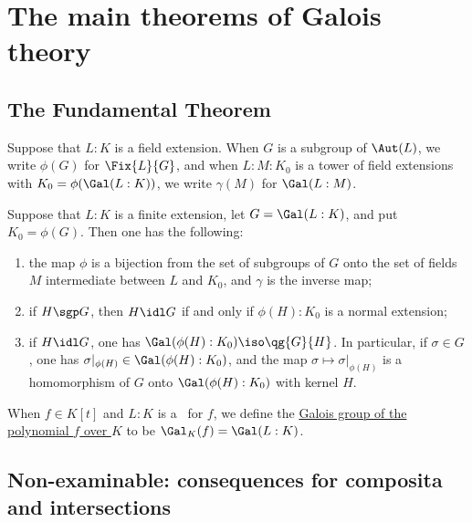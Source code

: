 \documentclass{article}
\begin{document}
\section{The main theorems of Galois theory}
\subsection{The Fundamental Theorem}
  \begin{tdefinition}
    Suppose that \( L:K \) is a field extension.
    When \( G \) is a subgroup of \( \Aut(L) \), we write \( \phi(G) \) for \( \Fix{L}{G} \), and when \( L:M:K_0 \) is a tower of field extensions with \( K_0=\phi(\Gal(L:K)) \), we write \( \gamma(M) \) for \( \Gal(L:M) \).
  \end{tdefinition}

  \begin{ttheorem}
    Suppose that \( L:K \) is a finite extension, let \( G=\Gal(L:K) \), and put \( K_0=\phi(G) \).
    Then one has the following: \begin{enumerate}[label=(\alph*)]
      \item the map \( \phi \) is a bijection from the set of subgroups of \( G \) onto the set of fields \( M \) intermediate between \( L \) and \( K_0 \), and \( \gamma \) is the inverse map;
      \item if \( H \sgp G \), then \( H\idl G \) if and only if \( \phi(H):K_0 \) is a normal extension;
      \item if \( H\idl G \), one has \( \Gal(\phi(H):K_0) \iso \qg{G}{H} \).
        In particular, if \( \sigma\in G \), one has \( \sigma|_{\phi(H)} \in \Gal(\phi(H):K_0) \), and the map \( \sigma\mapsto\sigma|_{\phi(H)} \) is a homomorphism of \( G \) onto \( \Gal(\phi(H):K_0) \) with kernel \( H \).
    \end{enumerate}
  \end{ttheorem}

  \begin{tdefinition}
    When \( f\in K[t] \) and \( L:K \) is a \sfe~for \( f \), we define the \ul{Galois group of the polynomial \( f \) over \( K \)} to be \( \Gal_K(f) = \Gal(L:K) \).
  \end{tdefinition}

\subsection{Non-examinable: consequences for composita and intersections}
\end{document}
